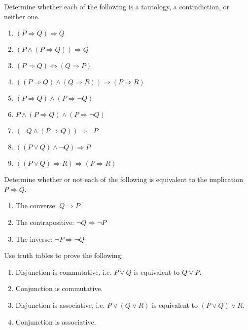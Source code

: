 \begin{exercise}\label{exer:taut}
Determine whether each of the following is a tautology, a contradiction, or neither one.
\begin{enumerate}\itemsep0pt
\item $(P\Rightarrow Q)\Rightarrow Q$

\item $(P\land(P\Rightarrow Q))\Rightarrow Q$

\item $(P\Rightarrow Q)\Leftrightarrow(Q\Rightarrow P)$

\item $((P\Rightarrow Q)\land(Q\Rightarrow R))\Rightarrow (P\Rightarrow
R)$

\item $(P\Rightarrow Q)\land(P\Rightarrow\neg Q)$

\item $P\land (P\Rightarrow Q)\land(P\Rightarrow\neg Q)$

\item $(\neg Q\land(P\Rightarrow Q))\Rightarrow \neg P$

\item $((P\lor Q)\land\neg Q)\Rightarrow P$

\item $((P\lor Q)\Rightarrow R)\Rightarrow(P\Rightarrow R)$
\end{enumerate}
\end{exercise}

\begin{exercise}\label{exer:contrapos}
Determine whether or not each of the following is equivalent to the implication $P\Rightarrow Q$.
\begin{enumerate}
\item The converse: $Q\Rightarrow P$ 
\item The contrapositive: $\neg Q\Rightarrow \neg P$ 
\item The inverse: $\neg P\Rightarrow\neg Q$ 
\end{enumerate}
\end{exercise}

\begin{exercise}\label{exer:conjdisj}
Use truth tables to prove the following:
\begin{enumerate}
\item Disjunction is commutative, i.e. $P\lor Q$ is equivalent to $Q\lor P$.
\item Conjunction is commutative.
\item Disjunction is associative, i.e. $P\lor(Q\lor R)$ is equivalent to $(P\lor Q)\lor R$.
\item Conjunction is associative.
\end{enumerate}
\end{exercise}

